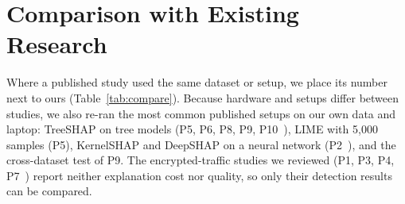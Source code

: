 \section{Comparison with Existing Research}
\label{sec:compare}
Where a published study used the same dataset or setup, we place its number next to ours (Table~\ref{tab:compare}). Because hardware and setups differ between studies, we also re-ran the most common published setups on our own data and laptop: TreeSHAP on tree models (P5, P6, P8, P9, P10~\cite{p5,p6,p8,p9,p10}), LIME with 5{,}000 samples (P5), KernelSHAP and DeepSHAP on a neural network (P2~\cite{p2}), and the cross-dataset test of P9. The encrypted-traffic studies we reviewed (P1, P3, P4, P7~\cite{p1,p3,p4,p7}) report neither explanation cost nor quality, so only their detection results can be compared.

